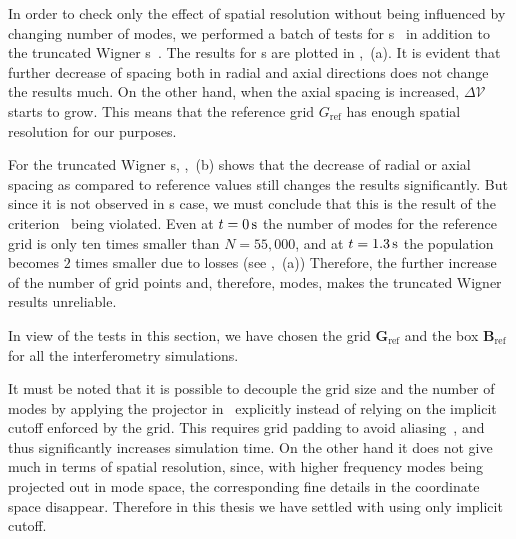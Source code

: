 In order to check only the effect of spatial resolution without being influenced by changing number of modes, we performed a batch of tests for s~ in addition to the truncated Wigner s~.
The results for s are plotted in ,~(a).
It is evident that further decrease of spacing both in radial and axial directions does not change the results much.
On the other hand, when the axial spacing is increased, $\Delta \mathcal{V}$ starts to grow.
This means that the reference grid $G_{\mathrm{ref}}$ has enough spatial resolution for our purposes.

For the truncated Wigner s, ,~(b) shows that the decrease of radial or axial spacing as compared to reference values still changes the results significantly.
But since it is not observed in s case, we must conclude that this is the result of the criterion~ being violated.
Even at $t=0\mbox{\ensuremath{\,\mathrm{s}}}$ the number of modes for the reference grid is only ten times smaller than $N=55,000$, and at $t=1.3\mbox{\ensuremath{\,\mathrm{s}}}$ the population becomes $2$ times smaller due to losses (see ,~(a))
Therefore, the further increase of the number of grid points and, therefore, modes, makes the truncated Wigner results unreliable.

In view of the tests in this section, we have chosen the grid $\mathbf{G}_{\mathrm{ref}}$ and the box $\mathbf{B}_{\mathrm{ref}}$ for all the interferometry simulations.

It must be noted that it is possible to decouple the grid size and the number of modes by applying the projector in~ explicitly instead of relying on the implicit cutoff enforced by the grid.
This requires grid padding to avoid aliasing~\cite{Norrie2006}, and thus significantly increases simulation time.
On the other hand it does not give much in terms of spatial resolution, since, with higher frequency modes being projected out in mode space, the corresponding fine details in the coordinate space disappear.
Therefore in this thesis we have settled with using only implicit cutoff.
